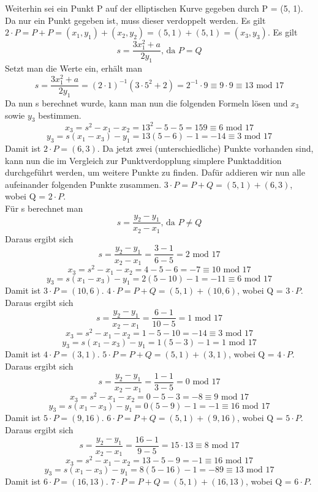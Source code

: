 Weiterhin sei ein Punkt P auf der elliptischen Kurve gegeben durch P = (5, 1). Da nur ein Punkt gegeben ist, muss dieser verdoppelt werden. Es gilt $2 \cdot P = P + P = (x_1, y_1) + (x_2, y_2) = (5, 1) + (5, 1) = (x_3, y_3)$. Es gilt
$$s = \frac{3x_1^2 + a}{2y_1} \text{, da } P = Q $$
Setzt man die Werte ein, erhält man 
$$s = \frac{3x_1^2 + a}{2y_1} = (2 \cdot 1)^{-1}(3 \cdot 5^2 + 2) = 2^{-1} \cdot 9 \equiv 9 \cdot 9 \equiv 13 \text{ mod } 17$$
Da nun s berechnet wurde, kann man nun die folgenden Formeln lösen und $x_3$ sowie $y_3$ bestimmen.
$$x_3 = s^2 - x_1 - x_2 = 13^2 - 5 - 5 = 159 \equiv 6 \text{ mod } 17$$
$$y_3 = s(x_1 - x_3) - y_1 = 13(5 - 6) - 1 = - 14 \equiv 3 \text{ mod } 17$$
Damit ist $2 \cdot P = (6, 3)$. Da jetzt zwei (unterschiedliche) Punkte vorhanden sind, kann nun die im Vergleich zur Punktverdopplung simplere Punktaddition durchgeführt werden, um weitere Punkte zu finden. Dafür addieren wir nun alle aufeinander folgenden Punkte zusammen. $3 \cdot P = P + Q = (5, 1) + (6, 3)$, wobei Q = $2 \cdot P$.\\
Für s berechnet man
$$s = \frac{y_2 - y_1}{x_2 - x_1} \text{, da } P \neq Q $$
Daraus ergibt sich 
$$s = \frac{y_2 - y_1}{x_2 -x_1} = \frac{3 - 1}{6 - 5} = 2 \text{ mod } 17$$
$$x_3 = s^2 - x_1 - x_2 = 4 - 5 - 6 = - 7 \equiv 10 \text{ mod } 17$$
$$y_3 = s(x_1 - x_3) - y_1 = 2(5 - 10) - 1 = - 11 \equiv 6 \text{ mod } 17$$
Damit ist $3 \cdot P = (10, 6)$. $4 \cdot P = P + Q = (5, 1) + (10, 6)$, wobei Q = $3 \cdot P$. 
Daraus ergibt sich 
$$s = \frac{y_2 - y_1}{x_2 -x_1} = \frac{6 - 1}{10 - 5} = 1 \text{ mod } 17$$
$$x_3 = s^2 - x_1 - x_2 = 1 - 5 - 10 = -14 \equiv 3 \text{ mod } 17$$
$$y_3 = s(x_1 - x_3) - y_1 = 1(5 - 3) - 1 = 1 \text{ mod } 17$$
Damit ist $4 \cdot P = (3, 1)$. $5 \cdot P = P + Q = (5, 1) + (3, 1)$, wobei Q = $4 \cdot P$.\\
Daraus ergibt sich 
$$s = \frac{y_2 - y_1}{x_2 -x_1} = \frac{1 - 1}{3 - 5} = 0 \text{ mod } 17$$
$$x_3 = s^2 - x_1 - x_2 = 0 - 5 - 3 = - 8 \equiv 9 \text{ mod } 17$$
$$y_3 = s(x_1 - x_3) - y_1 = 0(5 - 9) - 1 = - 1 \equiv 16 \text{ mod } 17$$
Damit ist $5 \cdot P = (9, 16)$. $6 \cdot P = P + Q = (5, 1) + (9, 16)$, wobei Q = $5 \cdot P$.\\
Daraus ergibt sich 
$$s = \frac{y_2 - y_1}{x_2 -x_1} = \frac{16 - 1}{9 - 5} = 15 \cdot 13 \equiv 8 \text{ mod } 17$$
$$x_3 = s^2 - x_1 - x_2 = 13 - 5 - 9 = -1 \equiv 16 \text{ mod } 17$$
$$y_3 = s(x_1 - x_3) - y_1 = 8(5 - 16) - 1 = - 89 \equiv 13 \text{ mod } 17$$
Damit ist $6 \cdot P = (16, 13)$. $7 \cdot P = P + Q = (5, 1) + (16, 13)$, wobei Q = $6 \cdot P$.\\
